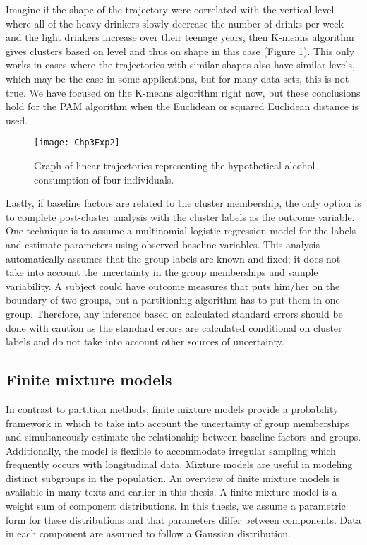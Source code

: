 Imagine if the shape of the trajectory were correlated with the vertical level where all of the heavy drinkers slowly decrease the number of drinks per week and the light drinkers increase over their teenage years, then K-means algorithm gives clusters based on level and thus on shape in this case (Figure \ref{fig:3-2}). This only works in cases where the trajectories with similar shapes also have similar levels, which may be the case in some applications, but for many data sets, this is not true. We have focused on the K-means algorithm right now, but these conclusions hold for the PAM algorithm when the Euclidean or squared Euclidean distance is used.
\begin{figure}
\begin{center}
\texttt{[image: Chp3Exp2]}
\end{center}
\caption{Graph of linear trajectories representing the hypothetical alcohol consumption of four individuals.}
\label{fig:3-2} 
\end{figure}

Lastly, if baseline factors are related to the cluster membership, the only option is to complete post-cluster analysis with the cluster labels as the outcome variable. One technique is to assume a multinomial logistic regression model for the labels and estimate parameters using observed baseline variables. This analysis automatically assumes that the group labels are known and fixed; it does not take into account the uncertainty in the group memberships and sample variability. A subject could have outcome measures that puts him/her on the boundary of two groups, but a partitioning algorithm has to put them in one group. Therefore, any inference based on calculated standard errors should be done with caution as the standard errors are calculated conditional on cluster labels and do not take into account other sources of uncertainty.

\subsection{Finite mixture models}
In contrast to partition methods, finite mixture models provide a probability framework in which to take into account the uncertainty of group memberships and simultaneously estimate the relationship between baseline factors and groups. Additionally, the model is flexible to accommodate irregular sampling which frequently occurs with longitudinal data. Mixture models are useful in modeling distinct subgroups in the population. An overview of finite mixture models is available in many texts \cite{everitt1981,mclachlan1988,mclachlan2000} and earlier in this thesis. A finite mixture model is a weight sum of component distributions. In this thesis, we assume a parametric form for these distributions and that parameters differ between components. Data in each component are assumed to follow a Gaussian distribution.

